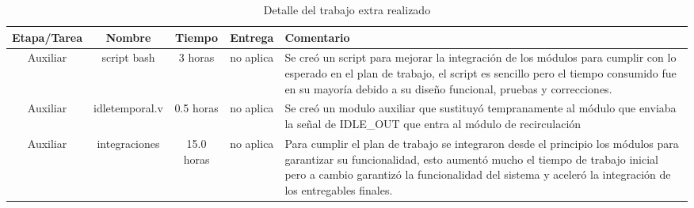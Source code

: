 \begin{table}[!hbt]
\centering
\caption{Detalle del trabajo extra realizado}
\label{tabla:trabajoextra}
\begin{tabular}{|c|c|c|c|m{5cm}|}
\hline 
Etapa/Tarea & Nombre & Tiempo & Entrega & Comentario \\ 
\hline 
Auxiliar & script bash & 3 horas & no aplica & Se cre\'o un script para mejorar la integraci\'on de los m\'odulos para cumplir con lo esperado en el plan de trabajo, el script es sencillo pero el tiempo consumido fue en su mayor\'ia debido a su diseño funcional, pruebas y correcciones.\\ 
\hline 
Auxiliar & idletemporal.v & 0.5 horas & no aplica & Se creó un modulo auxiliar que sustituyó tempranamente al m\'odulo que enviaba la señal de IDLE\_OUT que entra al m\'odulo de recirculaci\'on \\ 
\hline 
Auxiliar & integraciones & 15.0 horas & no aplica & Para cumplir el plan de trabajo se integraron desde el principio los módulos para garantizar su funcionalidad, esto aument\'o mucho el tiempo de trabajo inicial pero a cambio garantiz\'o la funcionalidad del sistema y aceler\'o la integraci\'on de los entregables finales.\\ 
\hline 
\end{tabular} 
\end{table}
